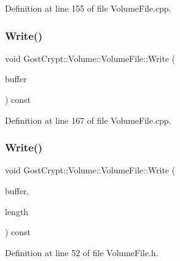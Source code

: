 Definition at line 155 of file Volume\+File.\+cpp.

\mbox{\label{class_gost_crypt_1_1_volume_1_1_volume_file_a583e2bc2ca68b887e5c58ce56b237b02}} 
\subsubsection{\texorpdfstring{Write()}{Write()}\hspace{0.1cm}{\footnotesize\ttfamily [1/2]}}
{\footnotesize\ttfamily void Gost\+Crypt\+::\+Volume\+::\+Volume\+File\+::\+Write (\begin{DoxyParamCaption}\item[{const \hyperlink{class_gost_crypt_1_1_buffer_ptr}{Buffer\+Ptr} \&}]{buffer }\end{DoxyParamCaption}) const}



Definition at line 167 of file Volume\+File.\+cpp.

\mbox{\label{class_gost_crypt_1_1_volume_1_1_volume_file_a149f808af3695cb419dd3a724d197240}} 
\subsubsection{\texorpdfstring{Write()}{Write()}\hspace{0.1cm}{\footnotesize\ttfamily [2/2]}}
{\footnotesize\ttfamily void Gost\+Crypt\+::\+Volume\+::\+Volume\+File\+::\+Write (\begin{DoxyParamCaption}\item[{const \hyperlink{class_gost_crypt_1_1_buffer_ptr}{Buffer\+Ptr} \&}]{buffer,  }\item[{size\+\_\+t}]{length }\end{DoxyParamCaption}) const\hspace{0.3cm}{\ttfamily [inline]}}



Definition at line 52 of file Volume\+File.\+h.

